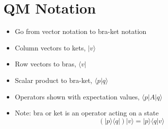 \documentclass[cplx.tex]{subfiles}
\begin{document}
\section{QM Notation}
\begin{itemize}
    \item Go from vector notation to bra-ket notation
    \item Column vectors to kets, $|v\rangle$
    \item Row vectors to bras, $\langle v|$
    \item Scalar product to bra-ket, $\langle p|q\rangle$
    \item Operators shown with expectation values, $\langle p|A|q\rangle$
    \item Note: bra or ket is an operator acting on a state
        \begin{equation}
            (|p\rangle\langle q|)|v\rangle = |p\rangle \langle q|v\rangle
        \end{equation}
\end{itemize}
\end{document}
